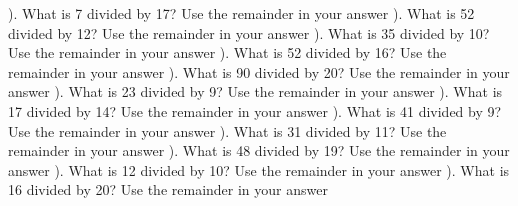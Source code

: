 \documentclass{article}%
\begin{document}
\newline%
). What is 7 divided by 17? Use the remainder in your answer%
\newline%
\newline%
). What is 52 divided by 12? Use the remainder in your answer%
\newline%
\newline%
). What is 35 divided by 10? Use the remainder in your answer%
\newline%
\newline%
). What is 52 divided by 16? Use the remainder in your answer%
\newline%
\newline%
). What is 90 divided by 20? Use the remainder in your answer%
\newline%
\newline%
). What is 23 divided by 9? Use the remainder in your answer%
\newline%
\newline%
). What is 17 divided by 14? Use the remainder in your answer%
\newline%
\newline%
). What is 41 divided by 9? Use the remainder in your answer%
\newline%
\newline%
). What is 31 divided by 11? Use the remainder in your answer%
\newline%
\newline%
). What is 48 divided by 19? Use the remainder in your answer%
\newline%
\newline%
). What is 12 divided by 10? Use the remainder in your answer%
\newline%
\newline%
). What is 16 divided by 20? Use the remainder in your answer%
\newline%
\newline%
\end{document}
